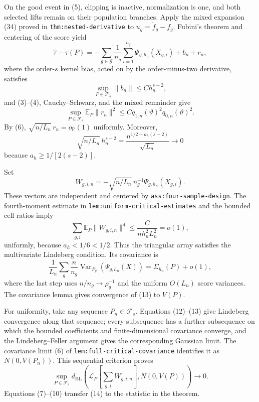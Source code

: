 On the good event in (5), clipping is inactive, normalization is one, and both selected lifts remain on their population branches.  Apply the mixed expansion (34) proved in \texttt{thm:nested-derivative} to \(u_g=\widetilde f_g-f_g\).  Fubini's theorem and centering of the score yield
\[
 \widehat\tau-\tau(P)
 =-\sum_{g\in\mathcal G}\frac1{n_g}\sum_{i=1}^{n_g}
   \Psi_{g,h_n}(X_{g,i})+b_n+r_n,                                     \tag{7}
\]
where the order-\(s\) kernel bias, acted on by the order-minus-two derivative, satisfies
\[
 \sup_{P\in\mathcal F_s}\|b_n\|\leq Ch_n^{s-2},                     \tag{8}
\]
and (3)--(4), Cauchy--Schwarz, and the mixed remainder give
\[
 \sup_{P\in\mathcal F_s}
 \mathbb E_P\|r_n\|^2
 \leq Cq_{1,n}(\vartheta)^2q_{0,n}(\vartheta)^2.                     \tag{9}
\]
By (6), \(\sqrt{n/L_n}\,r_n=o_{\mathbb P}(1)\) uniformly.  Moreover,
\[
 \sqrt{n/L_n}\,h_n^{s-2}
 =\frac{n^{1/2-a_h(s-2)}}{\sqrt{L_n}}\longrightarrow0                 \tag{10}
\]
because \(a_h\geq1/[2(s-2)]\).

Set
\[
 W_{g,i,n}=-\sqrt{n/L_n}\,n_g^{-1}\Psi_{g,h_n}(X_{g,i}).             \tag{11}
\]
These vectors are independent and centered by \texttt{ass:four-sample-design}.  The fourth-moment estimate in \texttt{lem:uniform-critical-estimates} and the bounded cell ratios imply
\[
 \sum_{g,i}\mathbb E_P\|W_{g,i,n}\|^4
 \leq\frac{C}{nh_n^2L_n^2}=o(1),                                     \tag{12}
\]
uniformly, because \(a_h<1/6<1/2\).  Thus the triangular array satisfies the multivariate Lindeberg condition.  Its covariance is
\[
 \frac1{L_n}\sum_g\frac n{n_g}
 \operatorname{Var}_{P_g}(\Psi_{g,h_n}(X))
 =\Sigma_{h_n}(P)+o(1),                                                \tag{13}
\]
where the last step uses \(n/n_g\to\rho_g^{-1}\) and the uniform \(O(L_n)\) score variances.  The covariance lemma gives convergence of (13) to \(V(P)\).

For uniformity, take any sequence \(P_n\in\mathcal F_s\).  Equations (12)--(13) give Lindeberg convergence along that sequence; every subsequence has a further subsequence on which the bounded coefficients and finite-dimensional covariance converge, and the Lindeberg--Feller argument gives the corresponding Gaussian limit.  The covariance limit (6) of \texttt{lem:full-critical-covariance} identifies it as \(N(0,V(P_n))\).  This sequential criterion proves
\[
 \sup_{P\in\mathcal F_s}d_{\mathrm{BL}}
 \left(\mathcal L_P\!\left[\sum_{g,i}W_{g,i,n}\right],N(0,V(P))\right)
 \longrightarrow0.                                                    \tag{14}
\]
Equations (7)--(10) transfer (14) to the statistic in the theorem.

